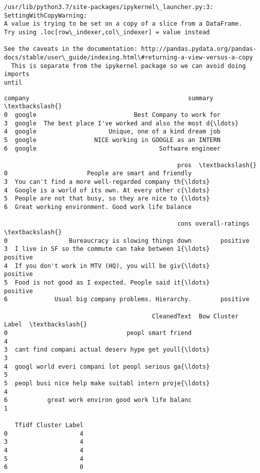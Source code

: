 \documentclass[11pt]{article}
\makeatletter
\newcommand{\boxspacing}{\kern\kvtcb@left@rule\kern\kvtcb@boxsep}
\newcommand{\prompt}[4]{
        \ttfamily\llap{{\color{#2}[#3]:\hspace{3pt}#4}}\vspace{-\baselineskip}
    }
\makeatother
\begin{document}
    \begin{Verbatim}[commandchars=\\\{\}]
/usr/lib/python3.7/site-packages/ipykernel\_launcher.py:3:
SettingWithCopyWarning:
A value is trying to be set on a copy of a slice from a DataFrame.
Try using .loc[row\_indexer,col\_indexer] = value instead

See the caveats in the documentation: http://pandas.pydata.org/pandas-
docs/stable/user\_guide/indexing.html\#returning-a-view-versus-a-copy
  This is separate from the ipykernel package so we can avoid doing imports
until
    \end{Verbatim}

            \begin{tcolorbox}[breakable, size=fbox, boxrule=.5pt, pad at break*=1mm, opacityfill=0]
\prompt{Out}{outcolor}{269}{\boxspacing}
\begin{Verbatim}[commandchars=\\\{\}]
  company                                            summary  \textbackslash{}
0  google                           Best Company to work for
3  google  The best place I've worked and also the most d{\ldots}
4  google                    Unique, one of a kind dream job
5  google                NICE working in GOOGLE as an INTERN
6  google                                  Software engineer

                                                pros  \textbackslash{}
0                      People are smart and friendly
3  You can't find a more well-regarded company th{\ldots}
4  Google is a world of its own. At every other c{\ldots}
5  People are not that busy, so they are nice to {\ldots}
6  Great working environment. Good work life balance

                                                cons overall-ratings  \textbackslash{}
0                 Bureaucracy is slowing things down        positive
3  I live in SF so the commute can take between 1{\ldots}        positive
4  If you don't work in MTV (HQ), you will be giv{\ldots}        positive
5  Food is not good as I expected. People said it{\ldots}        positive
6             Usual big company problems. Hierarchy.        positive

                                         CleanedText  Bow Cluster Label  \textbackslash{}
0                                 peopl smart friend                  4
3  cant find compani actual deserv hype get youll{\ldots}                  3
4  googl world everi compani lot peopl serious ga{\ldots}                  5
5  peopl busi nice help make suitabl intern proje{\ldots}                  4
6           great work environ good work life balanc                  1

   Tfidf Cluster Label
0                    4
3                    4
4                    4
5                    4
6                    0
\end{Verbatim}
\end{tcolorbox}
        
\end{document}
